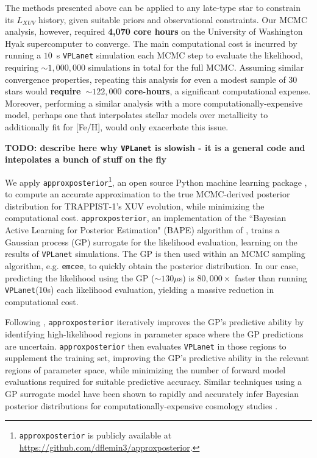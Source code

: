 \documentclass[twocolumn]{aastex62}
\newcommand{\xxx}[1]{{\textbf{#1}}}
\newcommand{\vplanet}[0]{\texttt{VPLanet}\xspace}
\newcommand{\emcee}[0]{\texttt{emcee}\xspace}
\newcommand{\approxposterior}[0]{\texttt{approxposterior}\xspace}
\begin{document}
The methods presented above can be applied to any late-type star to constrain its $L_{XUV}$ history, given suitable priors and observational constraints. Our MCMC analysis, however, required \xxx{4,070 core hours} on the University of Washington Hyak supercomputer to converge. The main computational cost is incurred by running a $10$~s \vplanet simulation each MCMC step to evaluate the likelihood, requiring ${\sim}1,000,000$ simulations in total for the full MCMC. Assuming similar convergence properties, repeating this analysis for even a modest sample of 30 stars would \xxx{require~${\sim} 122,000$ core-hours}, a significant computational expense. Moreover, performing a similar analysis with a more computationally-expensive model, perhaps one that interpolates stellar models over metallicity to additionally fit for [Fe/H], would only exacerbate this issue.

\xxx{TODO: describe here why \vplanet is slowish - it is a general code and intepolates a bunch of stuff on the fly}

We apply \approxposterior\footnote{\approxposterior is publicly available at \href{https://github.com/dflemin3/approxposterior}{https://github.com/dflemin3/approxposterior}.}, an open source Python machine learning package \citep{FlemingVanderPlas2018}, to compute an accurate approximation to the true MCMC-derived posterior distribution for TRAPPIST-1's XUV evolution, while minimizing the computational cost. \approxposterior, an implementation of the ``Bayesian Active Learning for Posterior Estimation" (BAPE) algorithm of \citet{Kandasamy2015}, trains a Gaussian process (GP) surrogate for the likelihood evaluation, learning on the results of \vplanet simulations. The GP is then used within an MCMC sampling algorithm, e.g. \emcee, to quickly obtain the posterior distribution. In our case, predicting the likelihood using the GP (${\sim} 130 \mu$s) is $80,000 \times$ faster than running \vplanet (10s) each likelihood evaluation, yielding a massive reduction in computational cost.

Following \citet{Kandasamy2015}, \approxposterior iteratively improves the GP's predictive ability by identifying high-likelihood regions in parameter space where the GP predictions are uncertain. \approxposterior then evaluates \vplanet in those regions to supplement the training set, improving the GP's predictive ability in the relevant regions of parameter space, while minimizing the number of forward model evaluations required for suitable predictive accuracy. Similar techniques using a GP surrogate model have been shown to rapidly and accurately infer Bayesian posterior distributions for computationally-expensive cosmology studies \citep[e.g.][]{Bird2019}.
\end{document}
